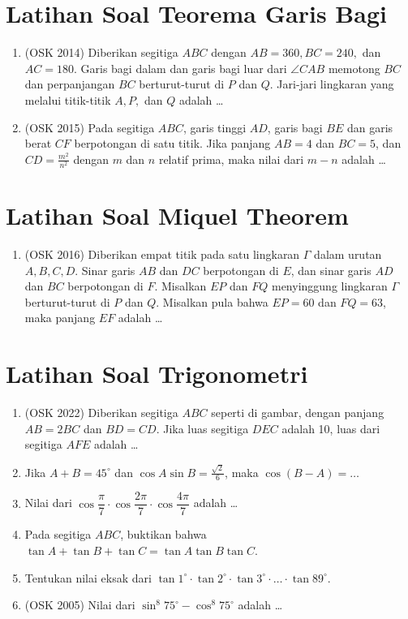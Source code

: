 \documentclass[12pt]{scrartcl}
\begin{document}
\section{Latihan Soal Teorema Garis Bagi}
\begin{enumerate}
    \item (OSK 2014) Diberikan segitiga $ABC$ dengan $AB = 360, BC = 240,$ dan $AC = 180$. Garis bagi dalam dan garis bagi luar dari $\angle CAB$ memotong $BC$ dan perpanjangan $BC$ berturut-turut di $P$ dan $Q$. Jari-jari lingkaran yang melalui titik-titik $A, P,$ dan $Q$ adalah \dots
    
    \item (OSK 2015) Pada segitiga $ABC$, garis tinggi $AD$, garis bagi $BE$ dan garis berat $CF$ berpotongan di satu titik. Jika panjang $AB = 4$ dan $BC = 5$, dan $CD = \frac{m^2}{n^2}$ dengan $m$ dan $n$ relatif prima, maka nilai dari $m - n$ adalah \ldots
\end{enumerate}
\section{Latihan Soal Miquel Theorem}
\begin{enumerate}
    \item (OSK 2016) Diberikan empat titik pada satu lingkaran $\Gamma$ dalam urutan $A,B,C,D$. Sinar garis $AB$ dan $DC$ berpotongan di $E$, dan sinar garis $AD$ dan $BC$ berpotongan di $F$. Misalkan $EP$ dan $FQ$ menyinggung lingkaran $\Gamma$ berturut-turut di $P$ dan $Q$. Misalkan pula bahwa $EP=60$ dan $FQ=63$, maka panjang $EF$ adalah \dots
\end{enumerate}
\section{Latihan Soal Trigonometri}
\begin{enumerate}
    \item (OSK 2022) Diberikan segitiga $ABC$ seperti di gambar, dengan panjang $AB = 2BC$ dan $BD = CD$. Jika luas segitiga $DEC$ adalah 10, luas dari segitiga $AFE$ adalah \dots

	\item Jika $A+B=45^\circ$ dan $\cos A\sin B=\frac{\sqrt{2}}{6}$, maka $\cos(B-A)=\dots$
	
	\item Nilai dari $\cos \dfrac{\pi}{7}\cdot \cos \dfrac{2\pi}{7} \cdot \cos \dfrac{4\pi}{7}$ adalah \dots
	
	\item Pada segitiga $ABC$, buktikan bahwa $\tan A + \tan B + \tan C = \tan A \tan B \tan C$.
	
	\item Tentukan nilai eksak dari $\tan 1^\circ \cdot \tan 2^\circ \cdot \tan 3^\circ \cdot \ldots \cdot \tan 89^\circ$.
	
	\item (OSK 2005) Nilai dari $\sin^8 75^\circ - \cos^8 75^\circ$ adalah \dots
\end{enumerate}
\end{document}
